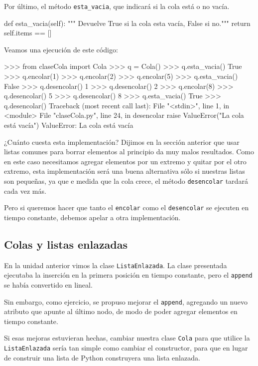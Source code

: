 Por último, el método \lstinline!esta_vacia!, que indicará si la cola está
o no vacía.

\begin{codigo-python-sn}
    def esta_vacia(self):
        """ Devuelve True si la cola esta vacía, False si no."""
        return self.items == []
\end{codigo-python-sn}

Veamos una ejecución de este código:

\begin{codigo-python-sn}
>>> from claseCola import Cola
>>> q = Cola()
>>> q.esta_vacia()
True
>>> q.encolar(1)
>>> q.encolar(2)
>>> q.encolar(5)
>>> q.esta_vacia()
False
>>> q.desencolar()
1
>>> q.desencolar()
2
>>> q.encolar(8)
>>> q.desencolar()
5
>>> q.desencolar()
8
>>> q.esta_vacia()
True
>>> q.desencolar()
Traceback (most recent call last):
  File "<stdin>", line 1, in <module>
  File "claseCola.py", line 24, in desencolar
    raise ValueError("La cola está vacía")
ValueError: La cola está vacía
\end{codigo-python-sn}

¿Cuánto cuesta esta implementación?  Dijimos en la sección anterior que
usar listas comunes para borrar elementos al principio da muy malos
resultados. Como en este caso necesitamos agregar elementos por un extremo
y quitar por el otro extremo, esta implementación será una buena
alternativa sólo si nuestras listas son pequeñas, ya que e medida que la
cola crece, el método \lstinline!desencolar! tardará cada vez más.

Pero si queremos hacer que tanto el \lstinline!encolar! como el
\lstinline!desencolar!  se ejecuten en tiempo constante, debemos apelar a
otra implementación.

\subsection{Colas y listas enlazadas}

En la unidad anterior vimos la clase \lstinline!ListaEnlazada!.
La clase presentada ejecutaba la inserción en la primera posición en
tiempo constante, pero el \lstinline|append| se había convertido en lineal.

Sin embargo, como ejercicio, se propuso mejorar el \lstinline|append|,
agregando un nuevo atributo que apunte al último nodo, de modo de poder
agregar elementos en tiempo constante.

Si esas mejoras estuvieran hechas, cambiar nuestra clase \lstinline!Cola!
para que utilice la \lstinline!ListaEnlazada! sería tan simple como cambiar
el constructor, para que en lugar de construir una lista de Python
construyera una lista enlazada.


